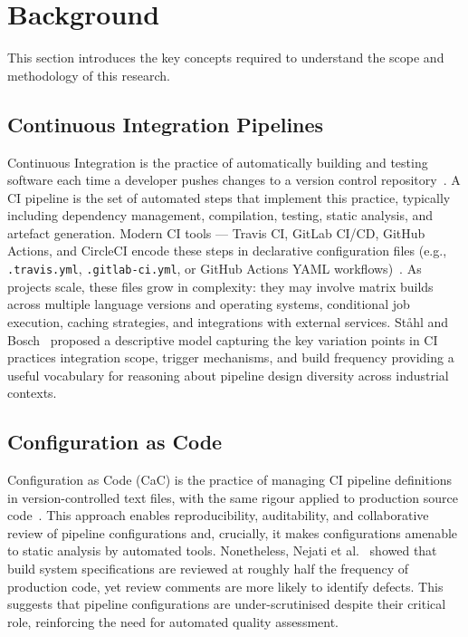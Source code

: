 \documentclass[12pt, a4paper]{article}
\begin{document}
\section{Background}

This section introduces the key concepts required to understand the scope and
methodology of this research.

\subsection{Continuous Integration Pipelines}

Continuous Integration is the practice of automatically building and testing software
each time a developer pushes changes to a version control repository~\cite{kinsman2021}.
A CI pipeline is the set of automated steps that implement this practice, typically
including dependency management, compilation, testing, static analysis, and artefact
generation. Modern CI tools --- Travis CI, GitLab CI/CD, GitHub Actions, and CircleCI encode
these steps in declarative configuration files (e.g., \texttt{.travis.yml},
\texttt{.gitlab-ci.yml}, or GitHub Actions YAML workflows)~\cite{bozhkov2024, gallaba2020}.
As projects scale, these files grow in complexity: they may involve matrix builds
across multiple language versions and operating systems, conditional job execution,
caching strategies, and integrations with external services. St{\aa}hl and Bosch~\cite{stahl2014}
proposed a descriptive model capturing the key variation points in CI practices integration
scope, trigger mechanisms, and build frequency providing a useful vocabulary for
reasoning about pipeline design diversity across industrial contexts.

\subsection{Configuration as Code}

Configuration as Code (CaC) is the practice of managing CI pipeline definitions in
version-controlled text files, with the same rigour applied to production source
code~\cite{layman2022}. This approach enables reproducibility, auditability, and
collaborative review of pipeline configurations and, crucially, it makes
configurations amenable to static analysis by automated tools. Nonetheless, Nejati
et al.~\cite{nejati2023} showed that build system specifications are reviewed at
roughly half the frequency of production code, yet review comments are more likely
to identify defects. This suggests that pipeline configurations are under-scrutinised
despite their critical role, reinforcing the need for automated quality assessment.
\end{document}
